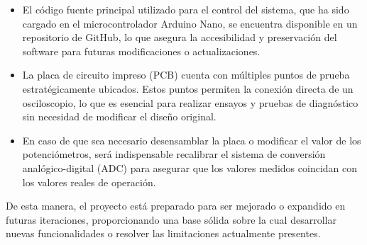\begin{itemize}
    \item El código fuente principal utilizado para el control del sistema, que ha sido cargado en el microcontrolador Arduino Nano, se encuentra disponible en un repositorio de GitHub, lo que asegura la accesibilidad y preservación del software para futuras modificaciones o actualizaciones.
    \item La placa de circuito impreso (PCB) cuenta con múltiples puntos de prueba estratégicamente ubicados. Estos puntos permiten la conexión directa de un osciloscopio, lo que es esencial para realizar ensayos y pruebas de diagnóstico sin necesidad de modificar el diseño original.
    \item En caso de que sea necesario desensamblar la placa o modificar el valor de los potenciómetros, será indispensable recalibrar el sistema de conversión analógico-digital (ADC) para asegurar que los valores medidos coincidan con los valores reales de operación.
\end{itemize}

De esta manera, el proyecto está preparado para ser mejorado o expandido en futuras iteraciones, proporcionando una base sólida sobre la cual desarrollar nuevas funcionalidades o resolver las limitaciones actualmente presentes.
